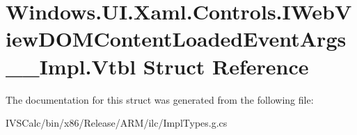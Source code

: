 \hypertarget{struct_windows_1_1_u_i_1_1_xaml_1_1_controls_1_1_i_web_view_d_o_m_content_loaded_event_args_____impl_1_1_vtbl}{}\section{Windows.\+U\+I.\+Xaml.\+Controls.\+I\+Web\+View\+D\+O\+M\+Content\+Loaded\+Event\+Args\+\_\+\+\_\+\+Impl.\+Vtbl Struct Reference}
\label{struct_windows_1_1_u_i_1_1_xaml_1_1_controls_1_1_i_web_view_d_o_m_content_loaded_event_args_____impl_1_1_vtbl}


The documentation for this struct was generated from the following file\+:\begin{DoxyCompactItemize}
\item 
I\+V\+S\+Calc/bin/x86/\+Release/\+A\+R\+M/ilc/Impl\+Types.\+g.\+cs\end{DoxyCompactItemize}
